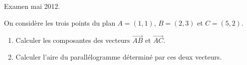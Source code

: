 
\begin{exercice}\label{exoOutilsMath-0147}

    Examen mai 2012.

    On considère les trois points du plan \( A=(1,1)\), \( B=(2,3)\) et \( C=(5,2)\).
    \begin{enumerate}
        \item
            Calculer les composantes des vecteurs \( \overrightarrow{ AB }\) et \( \overrightarrow{AC}\).
        \item
            Calculer l'aire du parallélogramme déterminé par ces deux vecteurs.
    \end{enumerate}

\end{exercice}
